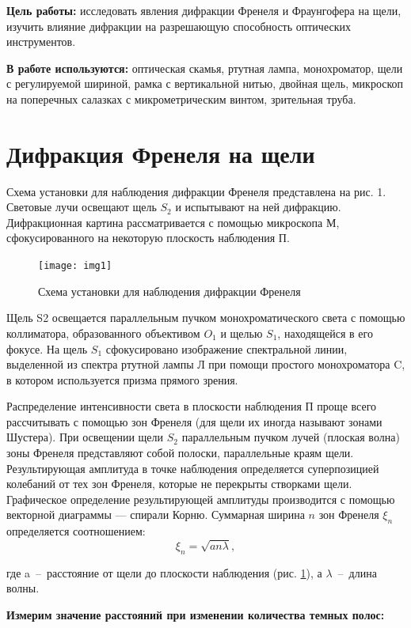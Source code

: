 \documentclass{letask}
\begin{document}


\textbf{Цель работы:} исследовать явления дифракции Френеля и Фраунгофера на щели, изучить влияние дифракции на разрешающую способность оптических инструментов.

\textbf{В работе используются:} оптическая скамья, ртутная лампа, монохроматор, щели с регулируемой шириной, рамка с вертикальной нитью, двойная щель, микроскоп на поперечных салазках с микрометрическим винтом, зрительная труба.

\section{Дифракция Френеля на щели}

Схема установки для наблюдения дифракции Френеля представлена на рис. 1. Световые лучи освещают щель $S_2$ и испытывают на ней дифракцию. Дифракционная картина рассматривается с помощью микроскопа М, сфокусированного на некоторую плоскость наблюдения П.

\begin{figure}[H]
\centering
	\texttt{[image: img1]}
	\caption{Схема установки для наблюдения дифракции Френеля}
	\label{fig:scheme}
\end{figure}


Щель S2 освещается параллельным пучком монохроматического света с помощью коллиматора, образованного объективом $O_1$ и щелью $S_1$, находящейся в его фокусе. На щель $S_1$ сфокусировано изображение спектральной линии, выделенной из спектра ртутной лампы Л при помощи простого монохроматора C, в котором используется призма прямого зрения. 

Распределение интенсивности света в плоскости наблюдения П проще всего рассчитывать с помощью зон Френеля (для щели их иногда называют зонами Шустера). При освещении щели $S_2$ параллельным пучком лучей (плоская волна) зоны Френеля представляют собой полоски, параллельные краям щели. Результирующая амплитуда в точке наблюдения определяется суперпозицией колебаний от тех зон Френеля, которые не перекрыты створками щели. Графическое определение результирующей амплитуды производится с помощью векторной диаграммы — спирали Корню. Суммарная ширина $n$ зон Френеля $\xi_n$ определяется соотношением: 
\[ \xi_n = \sqrt{an\lambda}, \]

где a~--~расстояние от щели до плоскости наблюдения (рис. \ref{fig:scheme}), а $\lambda$~--~длина волны.

\textbf{Измерим значение расстояний при изменении количества темных полос:}
\end{document}
